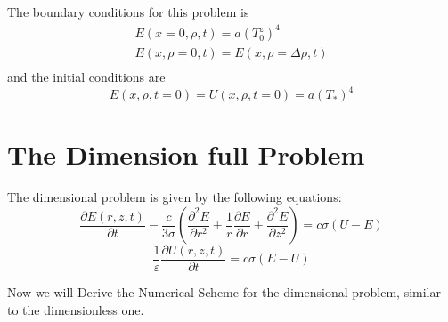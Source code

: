 \documentclass{article}
\begin{document}
The boundary conditions for this problem is
\ \begin{gather}
    E(x=0,\rho,t)=a(T_0^z)^4 \\
    E(x,\rho=0,t)=E(x,\rho=\Delta \rho,t) \\
\end{gather}
and the initial conditions are
\begin{equation}
    E(x,\rho,t=0)=U(x,\rho,t=0)=a(T_*)^4
\end{equation}

\section{The Dimension full Problem}
The dimensional problem is given by the following equations:
\begin{equation}
\frac{\partial E(r,z,t)}{\partial t} - \frac{c}{3\sigma}(\frac{\partial ^2 E}{\partial r^2} + 
\frac{1}{r}\frac{\partial E}{\partial r} + \frac{\partial ^2 E}{\partial z^2}) = c\sigma(U - E)
\end{equation}
\begin{equation}
\frac{1}{\varepsilon}\frac{\partial U(r,z,t)}{\partial t} = c\sigma(E - U)
\end{equation}

Now we will Derive the Numerical Scheme for the dimensional problem, similar to the dimensionless one.
\end{document}
